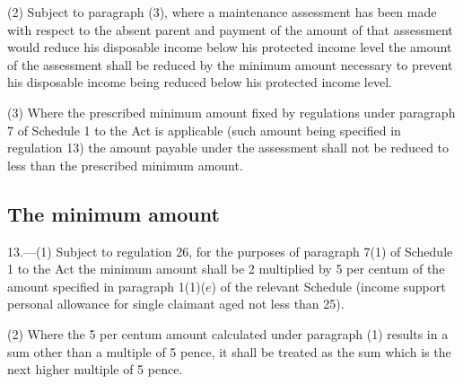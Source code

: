 \documentclass[12pt,a4paper]{article}
\begin{document}
(2) Subject to paragraph (3), where a maintenance assessment has been made with respect to the absent parent and payment of the amount of that assessment would reduce his disposable income below his protected income level the amount of the assessment shall be reduced by the minimum amount necessary to prevent his disposable income being reduced below his protected income level.

(3) Where the prescribed minimum amount fixed by regulations under paragraph 7 of Schedule 1 to the Act is applicable (such amount being specified in regulation 13) the amount payable under the assessment shall not be reduced to less than the prescribed minimum amount.


\subsection[13. The minimum amount]{The minimum amount}

13.—(1) Subject to regulation 26, for the purposes of paragraph 7(1) of Schedule 1 to the Act the minimum amount shall be 
2 multiplied by  %
5 per centum of the amount specified in paragraph 1(1)($e$) of the relevant Schedule (income support personal allowance for single claimant aged not less than 25).

(2) Where 
the 5 per centum amount  %
calculated under paragraph (1) results in a sum other than a multiple of 5 pence, it shall be treated as the sum which is the next higher multiple of 5 pence.
\end{document}
